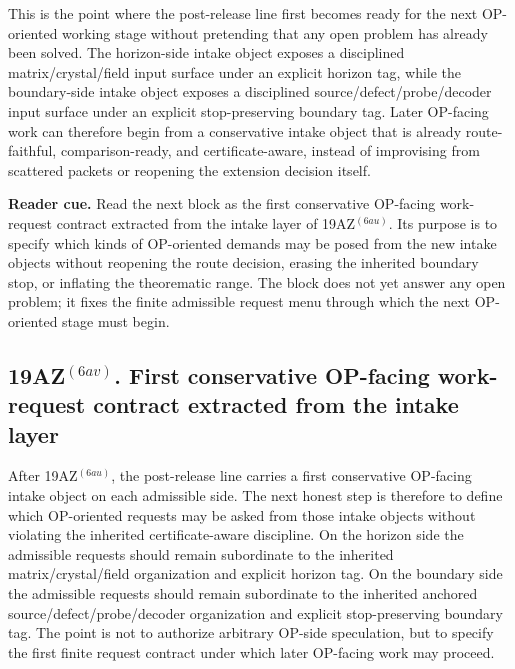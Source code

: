 \begin{remark}
\label{rem:what-the-first-conservative-op-facing-intake-layer-now-buys}
This is the point where the post-release line first becomes ready for the next OP-oriented working stage without pretending that any open problem has already been solved. The horizon-side intake object exposes a disciplined matrix/crystal/field input surface under an explicit horizon tag, while the boundary-side intake object exposes a disciplined source/defect/probe/decoder input surface under an explicit stop-preserving boundary tag. Later OP-facing work can therefore begin from a conservative intake object that is already route-faithful, comparison-ready, and certificate-aware, instead of improvising from scattered packets or reopening the extension decision itself.
\end{remark}




\noindent\textbf{Reader cue.} Read the next block as the first conservative OP-facing work-request contract extracted from the intake layer of 19AZ$^{(6au)}$. Its purpose is to specify which kinds of OP-oriented demands may be posed from the new intake objects without reopening the route decision, erasing the inherited boundary stop, or inflating the theorematic range. The block does not yet answer any open problem; it fixes the finite admissible request menu through which the next OP-oriented stage must begin.

\subsection*{19AZ$^{(6av)}$. First conservative OP-facing work-request contract extracted from the intake layer}
\label{sec:first-conservative-op-facing-work-request-contract-extracted-from-the-intake-layer}
After 19AZ$^{(6au)}$, the post-release line carries a first conservative OP-facing intake object on each admissible side. The next honest step is therefore to define which OP-oriented requests may be asked from those intake objects without violating the inherited certificate-aware discipline. On the horizon side the admissible requests should remain subordinate to the inherited matrix/crystal/field organization and explicit horizon tag. On the boundary side the admissible requests should remain subordinate to the inherited anchored source/defect/probe/decoder organization and explicit stop-preserving boundary tag. The point is not to authorize arbitrary OP-side speculation, but to specify the first finite request contract under which later OP-facing work may proceed.

